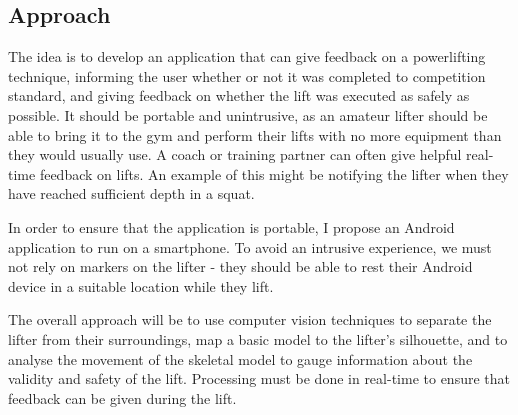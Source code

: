 \subsection{Approach}

The idea is to develop an application that can give feedback on a powerlifting technique, informing the user whether or not it was completed to competition standard, and giving feedback on whether the lift was executed as safely as possible. It should be portable and unintrusive, as an amateur lifter should be able to bring it to the gym and perform their lifts with no more equipment than they would usually use. A coach or training partner can often give helpful real-time feedback on lifts. An example of this might be notifying the lifter when they have reached sufficient depth in a squat.

In order to ensure that the application is portable, I propose an Android application to run on a smartphone. To avoid an intrusive experience, we must not rely on markers on the lifter - they should be able to rest their Android device in a suitable location while they lift.

The overall approach will be to use computer vision techniques to separate the lifter from their surroundings, map a basic model to the lifter's silhouette, and to analyse the movement of the skeletal model to gauge information about the validity and safety of the lift. Processing must be done in real-time to ensure that feedback can be given during the lift.